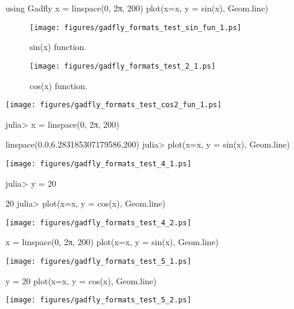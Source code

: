 

\begin{juliacode}
using Gadfly
x = linspace(0, 2π, 200)
plot(x=x, y = sin(x), Geom.line)
\end{juliacode}
\begin{figure}[ht]
\center
\texttt{[image: figures/gadfly\_formats\_test\_sin\_fun\_1.ps]}
\caption{sin(x) function.}
\label{fig:sin_fun}
\end{figure}



\begin{figure}[htpb]
\center
\texttt{[image: figures/gadfly\_formats\_test\_2\_1.ps]}
\caption{cos(x) function.}
\end{figure}



\texttt{[image: figures/gadfly\_formats\_test\_cos2\_fun\_1.ps]}



\begin{juliaterm}
julia> x = linspace(0, 2π, 200)

linspace(0.0,6.283185307179586,200)
julia> plot(x=x, y = sin(x), Geom.line)

\end{juliaterm}
\texttt{[image: figures/gadfly\_formats\_test\_4\_1.ps]}

\begin{juliaterm}
julia> y = 20

20
julia> plot(x=x, y = cos(x), Geom.line)
\end{juliaterm}
\texttt{[image: figures/gadfly\_formats\_test\_4\_2.ps]}



\begin{juliacode}
x = linspace(0, 2π, 200)
plot(x=x, y = sin(x), Geom.line)

\end{juliacode}
\texttt{[image: figures/gadfly\_formats\_test\_5\_1.ps]}

\begin{juliacode}
y = 20
plot(x=x, y = cos(x), Geom.line)
\end{juliacode}
\texttt{[image: figures/gadfly\_formats\_test\_5\_2.ps]}
